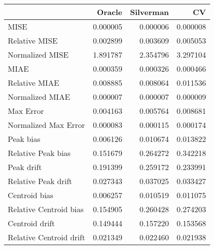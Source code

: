 \begin{tabular}{lrrr}
  \hline
 & Oracle & Silverman & CV \\ 
  \hline
MISE & 0.000005 & 0.000006 & 0.000008 \\ 
  Relative MISE & 0.002899 & 0.003609 & 0.005053 \\ 
  Normalized MISE & 1.891787 & 2.354796 & 3.297104 \\ 
  MIAE & 0.000359 & 0.000326 & 0.000466 \\ 
  Relative MIAE & 0.008885 & 0.008064 & 0.011536 \\ 
  Normalized MIAE & 0.000007 & 0.000007 & 0.000009 \\ 
  Max Error & 0.004163 & 0.005764 & 0.008681 \\ 
  Normalized Max Error & 0.000083 & 0.000115 & 0.000174 \\ 
  Peak bias & 0.006126 & 0.010674 & 0.013822 \\ 
  Relative Peak bias & 0.151679 & 0.264272 & 0.342218 \\ 
  Peak drift & 0.191399 & 0.259172 & 0.233991 \\ 
  Relative Peak drift & 0.027343 & 0.037025 & 0.033427 \\ 
  Centroid bias & 0.006257 & 0.010519 & 0.011075 \\ 
  Relative Centroid bias & 0.154905 & 0.260428 & 0.274203 \\ 
  Centroid drift & 0.149444 & 0.157220 & 0.153568 \\ 
  Relative Centroid drift & 0.021349 & 0.022460 & 0.021938 \\ 
   \hline
\end{tabular}
